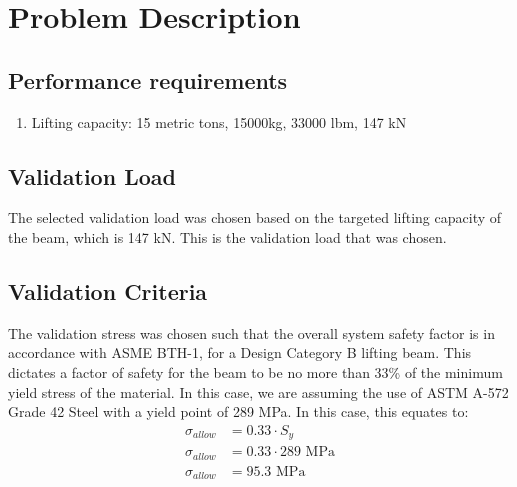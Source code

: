 \section{Problem Description}
\subsection{Performance requirements}
\begin{enumerate}
\item Lifting capacity: 15 metric tons, 15000kg, 33000 lbm, 147 kN
\end{enumerate}
\subsection{Validation Load}
The selected validation load was chosen based on the targeted lifting capacity of the beam, which is 147 kN. This is the validation load that was chosen. 
\subsection{Validation Criteria}
The validation stress was chosen such that the overall system safety factor is in accordance with ASME BTH-1, for a Design Category B lifting beam. This dictates a factor of safety for the beam to be no more than 33\% of the minimum yield stress of the material. In this case, we are assuming the use of ASTM A-572 Grade 42 Steel with a yield point of 289 MPa. 
In this case, this equates to:
\begin{align*}
	\sigma_{\mathit{allow}} &= 0.33 \cdot S_{y}\\
	\sigma_{allow} &= 0.33 \cdot 289  \text{ MPa} \\
	\sigma_{allow} &= 95.3 \text{ MPa}
\end{align*}
